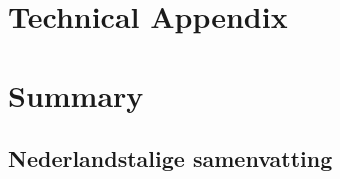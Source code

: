 \documentclass[final,twoside,svgnames]{book}
\begin{document}


\chapter{Technical Appendix}
{




}

\backmatter

\chapter{Summary}


\begin{otherlanguage}{dutch}
\chapter{Nederlandstalige samenvatting}

\end{otherlanguage}




\listoffigures
\listoftables

\clearpage
{}
\printindex
\end{document}
